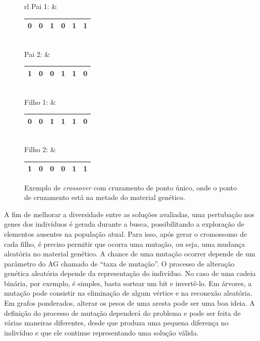 \begin{figure}[!htbp]
	\centering
	\renewcommand{\arraystretch}{2} 
	\begin{tabular}{rl}
		Pai 1: & 
		\renewcommand{\arraystretch}{1.15} 
		\begin{tabular}{|c|c|c|c|c|c|}
			\hline 
			\rowcolor[HTML]{F5D1CF}
			0 & 0 & 1 & 0 & 1 & 1 \\
			\hline 
		\end{tabular}
		\\
		Pai 2: & 
		\renewcommand{\arraystretch}{1.15} 
		\begin{tabular}{|c|c|c|c|c|c|}
			\hline 
			\rowcolor[HTML]{CCCCFF}
			1 & 0 & 0 & 1 & 1 & 0 \\
			\hline 
		\end{tabular}
		\\
		Filho 1: & 
		\renewcommand{\arraystretch}{1.15} 
		\begin{tabular}{|c|c|c|c|c|c|}
			\hline 
			\cellcolor[HTML]{F5D1CF}0 & \cellcolor[HTML]{F5D1CF}0 & \cellcolor[HTML]{F5D1CF}1 & \cellcolor[HTML]{CCCCFF}1 & \cellcolor[HTML]{CCCCFF}1 & \cellcolor[HTML]{CCCCFF}0 \\
			\hline 
		\end{tabular}
		\\
		Filho 2: & 
		\renewcommand{\arraystretch}{1.15} 
		\begin{tabular}{|c|c|c|c|c|c|}
			\hline 
			\cellcolor[HTML]{CCCCFF}1 & \cellcolor[HTML]{CCCCFF}0 & \cellcolor[HTML]{CCCCFF}0 & \cellcolor[HTML]{F5D1CF}0 & \cellcolor[HTML]{F5D1CF}1 & \cellcolor[HTML]{F5D1CF}1 \\
			\hline 
		\end{tabular}
	\end{tabular}
	\caption{\label{fig_cross_ponto_unico}Exemplo de \textit{crossover} com cruzamento de ponto único, onde o ponto de cruzamento está na metade do material genético.}
\end{figure}

A fim de melhorar a diversidade entre as soluções avaliadas, uma pertubação nos genes dos indivíduos é gerada durante a busca, possibilitando a exploração de elementos ausentes na população atual. Para isso, após gerar o cromossomo de cada filho, é preciso permitir que ocorra uma mutação, ou seja, uma mudança aleatória no material genético. A chance de uma mutação ocorrer depende de um parâmetro do AG chamado de ``taxa de mutação''. O processo de alteração genética aleatória depende da representação do indivíduo. No caso de uma cadeia binária, por exemplo, é simples, basta sortear um bit e invertê-lo. Em árvores, a mutação pode consistir na eliminação de algum vértice e na reconexão aleatória. Em grafos ponderados, alterar os pesos de uma aresta pode ser uma boa ideia. A definição do processo de mutação dependerá do problema e pode ser feita de várias maneiras diferentes, desde que produza uma pequena diferença no indivíduo e que ele continue representando uma solução válida.

